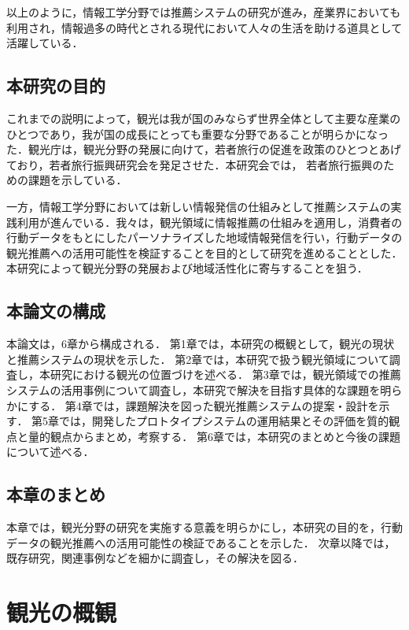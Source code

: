 \documentclass{jsarticle}
\begin{document}
以上のように，情報工学分野では推薦システムの研究が進み，産業界においても利用され，情報過多の時代とされる現代において人々の生活を助ける道具として活躍している．

\subsection{本研究の目的}

これまでの説明によって，観光は我が国のみならず世界全体として主要な産業のひとつであり，我が国の成長にとっても重要な分野であることが明らかになった．観光庁は，観光分野の発展に向けて，若者旅行の促進を政策のひとつとあげており，若者旅行振興研究会を発足させた．本研究会では， 若者旅行振興のための課題を示している．

一方，情報工学分野においては新しい情報発信の仕組みとして推薦システムの実践利用が進んでいる．我々は，観光領域に情報推薦の仕組みを適用し，消費者の行動データをもとにしたパーソナライズした地域情報発信を行い，行動データの観光推薦への活用可能性を検証することを目的として研究を進めることとした．本研究によって観光分野の発展および地域活性化に寄与することを狙う．

\subsection{本論文の構成}

本論文は，6章から構成される．
第1章では，本研究の概観として，観光の現状と推薦システムの現状を示した．
第2章では，本研究で扱う観光領域について調査し，本研究における観光の位置づけを述べる．
第3章では，観光領域での推薦システムの活用事例について調査し，本研究で解決を目指す具体的な課題を明らかにする．
第4章では，課題解決を図った観光推薦システムの提案・設計を示す．
第5章では，開発したプロトタイプシステムの運用結果とその評価を質的観点と量的観点からまとめ，考察する．
第6章では，本研究のまとめと今後の課題について述べる．

\subsection{本章のまとめ}

本章では，観光分野の研究を実施する意義を明らかにし，本研究の目的を，行動データの観光推薦への活用可能性の検証であることを示した．
次章以降では，既存研究，関連事例などを細かに調査し，その解決を図る．

\newpage

\section{観光の概観}
\end{document}

